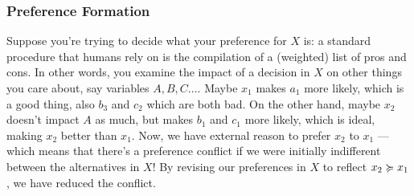\documentclass{article}
\begin{document}
	\subsubsection{Preference Formation}
	Suppose you're trying to decide what your preference for $X$ is: a standard procedure that humans rely on is the compilation of a (weighted) list of pros and cons. In other words, you examine the impact of a decision in $X$ on other things you care about, say variables $A, B, C\ldots$. Maybe $x_1$ makes $a_1$ more likely, which is a good thing, also $b_3$ and $c_2$ which are both bad. On the other hand, maybe $x_2$ doesn't impact $A$ as much, but makes $b_1$ and $c_1$ more likely, which is ideal, making $x_2$ better than $x_1$. Now, we have external reason to prefer $x_2$ to $x_1$ --- which means that there's a preference conflict if we were initially indifferent between the alternatives in $X$! By revising our preferences in $X$ to reflect $x_2 \succcurlyeq x_1$, we have reduced the conflict. 

	\begin{center}
	\end{center}
\end{document}
